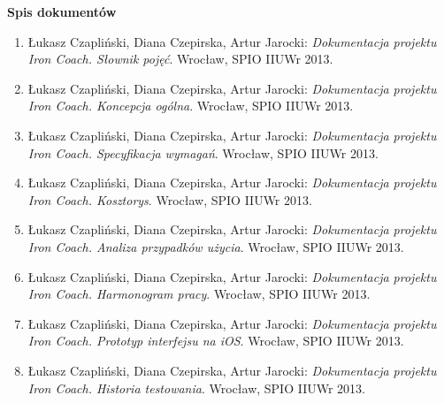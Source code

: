 


\newcommand{\quickbib}[1]{\item Łukasz Czapliński, Diana Czepirska, Artur Jarocki: {\it Dokumentacja projektu Iron Coach. #1}. Wrocław, SPIO IIUWr 2013.}

\vspace*{1cm}
{\textbf{\large{Spis dokumentów}}}\vspace{0.5cm}
\begin{enumerate}\itemsep5pt
      \quickbib{Słownik pojęć}
      \quickbib{Koncepcja ogólna}
      \quickbib{Specyfikacja wymagań}
      \quickbib{Kosztorys}
      \quickbib{Analiza przypadków użycia}
      \quickbib{Harmonogram pracy}
      \quickbib{Prototyp interfejsu na iOS}
      \quickbib{Historia testowania}
\end{enumerate}
\vfill


